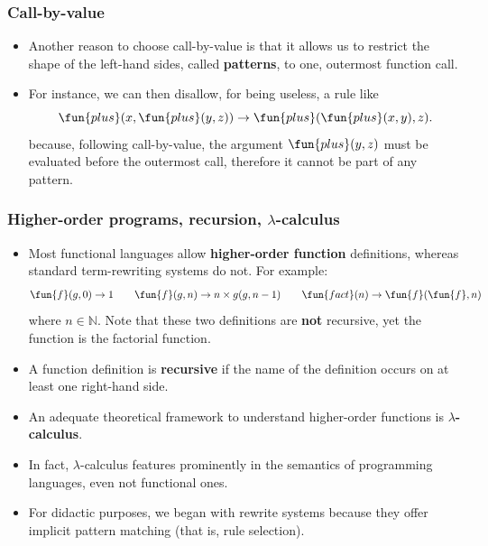 \documentclass[compress,dvips,xcolor={dvipsnames},t]{beamer}
\begin{document}
\begin{frame}
  \frametitle{Call-by-value}

  \begin{itemize}

    \item Another reason to choose call-by-value is that it allows us
      to restrict the shape of the left\hyp{}hand sides, called
      \textbf{patterns}, to one, outermost function call.

    \item For instance, we can then disallow, for being useless, a
      rule like
      \begin{equation*}
        \fun{plus}(x,\fun{plus}(y,z)) \rightarrow
        \fun{plus}(\fun{plus}(x,y),z).
      \end{equation*}
      \noindent because, following call\hyp{}by\hyp{}value, the argument
      \(\fun{plus}(y,z)\) must be evaluated before the outermost call,
      therefore it cannot be part of any pattern.

  \end{itemize}

\end{frame}

\begin{frame}
  \frametitle{Higher-order programs, recursion, $\lambda$-calculus}

  \begin{itemize}

    \item Most functional languages allow \textbf{higher\hyp{}order
      function} definitions, whereas standard term\hyp{}rewriting
      systems do not. For example:
      \begin{equation*}
        \fun{f}(g,0) \rightarrow 1
        \qquad
        \fun{f}(g,n) \rightarrow n \times g(g,n-1)
        \qquad
        \fun{fact}(n) \rightarrow \fun{f}(\fun{f},n)
      \end{equation*}
      where \(n \in \mathbb{N}\). Note that these two definitions are
      \textbf{not} recursive, yet the function  is the
      factorial function.

    \item A function definition is \textbf{recursive} if the name of
      the definition occurs on at least one right\hyp{}hand side.

    \item An adequate theoretical framework to understand
      higher\hyp{}order functions is \textbf{\(\lambda\)-calculus}.

    \item In fact, \(\lambda\)-calculus features prominently in the
      semantics of programming languages, even not functional ones.

    \item For didactic purposes, we began with rewrite systems because
      they offer implicit pattern matching (that is, rule selection).

  \end{itemize}

\end{frame}
\end{document}
